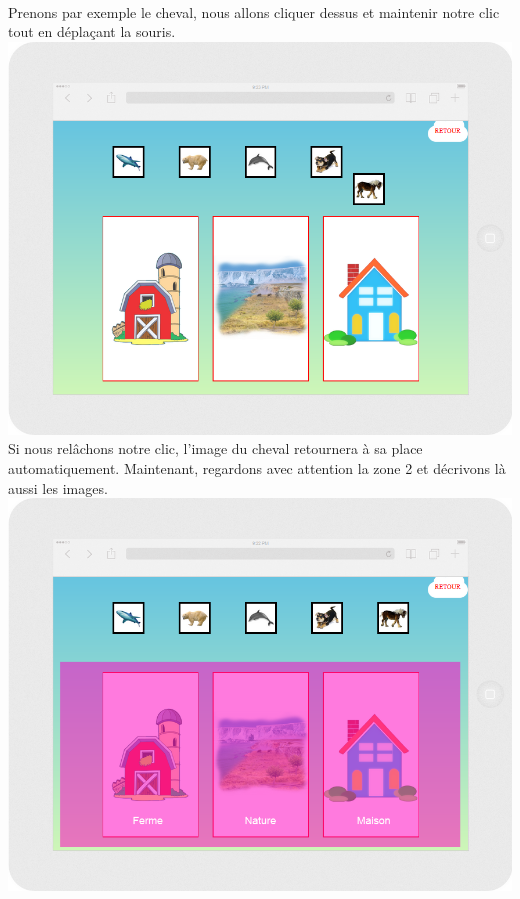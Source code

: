 \documentclass{article}
\begin{document}
\vspace{0.5cm}\\
Prenons par exemple le cheval, nous allons cliquer dessus et maintenir notre clic tout en dépla\c{c}ant la souris.
\vspace{0.5cm}\\
\includegraphics[width=1.0\textwidth]{zone2}
\vspace{0.5cm}\\
Si nous rel\^achons notre clic, l'image du cheval retournera à sa place automatiquement. Maintenant, regardons avec attention la zone 2 et décrivons là aussi les images. 
\vspace{0.5cm}\\
\includegraphics[width=1.0\textwidth]{zone3}
\end{document}
